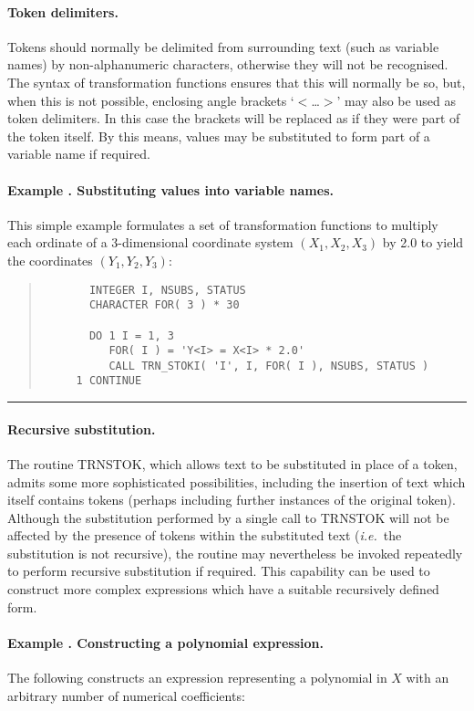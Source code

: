 \documentclass[twoside,11pt]{article}
\renewcommand{\_}{\texttt{\symbol{95}}}
\newcommand{\name}[1]{\mbox{\small{#1}}}
\newcounter{examplecounter}
\newcommand{\example}[1]{\addtocounter{examplecounter}{1}
                         \paragraph{\textbf{Example \theexamplecounter. #1}}}
\newcommand{\exampledone}[0]{\begin{center} \rule{6em}{0.2mm} \end{center}}
\begin{document}
\paragraph{Token delimiters.}
Tokens should normally be delimited from surrounding text (such as variable
names) by non-alphanumeric characters, otherwise they will not be
recognised.
The syntax of transformation functions ensures that this will normally be
so, but, when this is not possible, enclosing angle brackets `$<$\ldots $>$'
may also be used as token delimiters.
In this case the brackets will be replaced as if they were part of the token
itself.
By this means, values may be substituted to form part of a variable name if
required.

\example{Substituting values into variable names.}
This simple example formulates a set of transformation functions to multiply
each ordinate of a 3-dimensional coordinate system \mbox{$(X_1,X_2,X_3)$} by
2.0 to yield the coordinates \mbox{$(Y_1,Y_2,Y_3)$}:

\begin{quote}
\begin{verbatim}
       INTEGER I, NSUBS, STATUS
       CHARACTER FOR( 3 ) * 30

       DO 1 I = 1, 3
          FOR( I ) = 'Y<I> = X<I> * 2.0'
          CALL TRN_STOKI( 'I', I, FOR( I ), NSUBS, STATUS )
     1 CONTINUE
\end{verbatim}
\end{quote}
\exampledone

\paragraph{Recursive substitution.}
The routine \name{TRN\_STOK}, which allows text to be substituted in place
of a token, admits some more sophisticated possibilities, including the
insertion of text which itself contains tokens (perhaps including further
instances of the original token).
Although the substitution performed by a single call to \name{TRN\_STOK}
will not be affected by the presence of tokens within the substituted text
(\emph{i.e.}\ the substitution is not recursive), the routine may nevertheless
be invoked repeatedly to perform recursive substitution if required.
This capability can be used to construct more complex expressions which have
a suitable recursively defined form.

\example{Constructing a polynomial expression.}
The following constructs an expression representing a polynomial in $X$ with
an arbitrary number of numerical coefficients:
\end{document}
